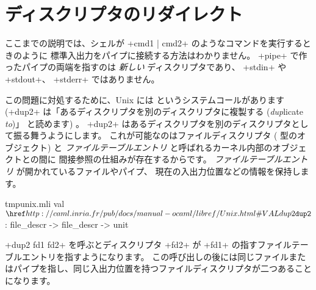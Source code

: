 \section{ディスクリプタのリダイレクト}

ここまでの説明では、シェルが \ml+cmd1 | cmd2+ のようなコマンドを実行するときのように
標準入出力をパイプに接続する方法はわかりません。
\ml+pipe+ で作ったパイプの両端を指すのは \emph{新しい} ディスクリプタであり、
\ml+stdin+ や \ml+stdout+、 \ml+stderr+ ではありません。

この問題に対処するために、Unix には  というシステムコールがあります
(\ml+dup2+ は「あるディスクリプタを別のディスクリプタに複製する (\emph{dup}licate \emph{to})」 と読めます) 。
\ml+dup2+ はあるディスクリプタを別のディスクリプタとして振る舞うようにします。
これが可能なのはファイルディスクリプタ ( 型のオブジェクト)
と \emph{ファイルテーブルエントリ} と呼ばれるカーネル内部のオブジェクトとの間に
間接参照の仕組みが存在するからです。 \emph{ファイルテーブルエントリ} が開かれているファイルやパイプ、
現在の入出力位置などの情報を保持します。
%
\begin{listingcodefile}{tmpunix.mli}
val $\libvalue{Unix}{dup2}$ : file_descr -> file_descr -> unit
\end{listingcodefile}
%
\ml+dup2 fd1 fd2+ を呼ぶとディスクリプタ \ml+fd2+ が \ml+fd1+ の指すファイルテーブルエントリを指すようになります。
この呼び出しの後には同じファイルまたはパイプを指し、同じ入出力位置を持つファイルディスクリプタが二つあることになります。

